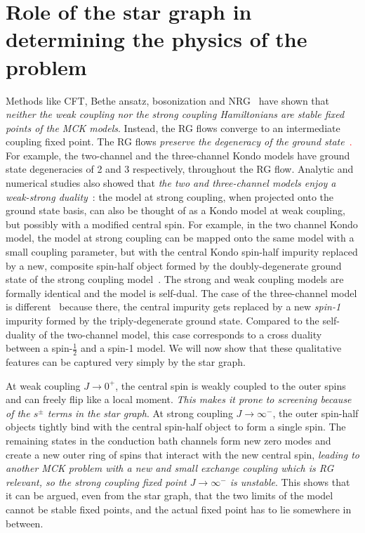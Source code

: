 \documentclass[12pt]{revtex4-2}
\begin{document}
\section{Role of the star graph in determining the physics of the problem}
Methods like CFT, Bethe ansatz, bosonization and NRG~\cite{affleck_1991_overscreen,Tsvelick_Weigmann_mchannel_1984,Gan_mchannel_1994,pang_cox_1991,emery_kivelson,vondelft_prl_1998} have shown that \textit{neither the weak coupling nor the strong coupling Hamiltonians are stable fixed points of the MCK models}. Instead, the RG flows converge to an intermediate coupling fixed point. The RG flows \textit{preserve the degeneracy of the ground state}~\cite{pang_cox_1991,kroha_kolf_2007,zitko_fabrizio_2017}\textcolor{red}. For example, the two-channel and the three-channel Kondo models have ground state degeneracies of 2 and 3 respectively, throughout the RG flow. Analytic and numerical studies also showed that \textit{the two and three-channel models enjoy a weak-strong duality}~\cite{kroha_kolf_2007,zitko_fabrizio_2017}: the model at strong coupling, when projected onto the ground state basis, can also be thought of as a Kondo model at weak coupling, but possibly with a modified central spin. For example, in the two channel Kondo model, the model at strong coupling can be mapped onto the same model with a small coupling parameter, but with the central Kondo spin-half impurity replaced by a new, composite spin-half object formed by the doubly-degenerate ground state of the strong coupling model~\cite{kroha_kolf_2007}. The strong and weak coupling models are formally identical and the model is self-dual. The case of the three-channel model is different~\cite{zitko_fabrizio_2017} because there, the central impurity gets replaced by a new \textit{spin-1} impurity formed by the triply-degenerate ground state. Compared to the self-duality of the two-channel model, this case corresponds to a cross duality between a spin-\(\frac{1}{2}\) and a spin-1 model. We will now show that these qualitative features can be captured very simply by the star graph.

At weak coupling \(J \to 0^+\), the central spin is weakly coupled to the outer spins and can freely flip like a local moment. \textit{This makes it prone to screening because of the \(s^\pm\) terms in the star graph}. At strong coupling \(J \to \infty^-\), the outer spin-half objects tightly bind with the central spin-half object to form a single spin. The remaining states in the conduction bath channels form new zero modes and create a new outer ring of spins that interact with the new central spin, \textit{leading to another MCK problem with a new and small exchange coupling which is RG relevant, so the strong coupling fixed point \(J \to \infty^-\) is unstable}. This shows that it can be argued, even from the star graph, that the two limits of the model cannot be stable fixed points, and the actual fixed point has to lie somewhere in between.
\end{document}
